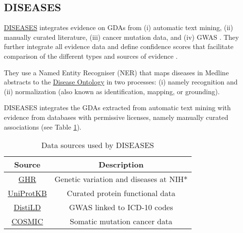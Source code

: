 \subsection{DISEASES}
\label{subsec:DISEASES}
\href{https://goo.gl/KGQsd9}{DISEASES} integrates evidence on GDAs from (i) automatic text mining, (ii) manually curated literature, (iii) cancer mutation data, and (iv) GWAS \cite{DISEASES2015}. They further integrate all evidence data and define confidence scores that facilitate comparison of the different types and sources of evidence \cite{DISEASES2015}.

They use a Named Entity Recogniser (NER) that maps diseases in Medline abstracts to the \href{http://disease-ontology.org/}{Disease Ontology} \cite{schriml2012} in two processes: (i) namely recognition and (ii) normalization (also known as identification, mapping, or grounding).

DISEASES integrates the GDAs extracted from automatic text mining with evidence from databases with permissive licenses, namely manually curated associations (see Table \ref{tab:diseases_data}).
\begin{table}[H]
\centering
    \begin{tabular}{c|c}
         Source & Description  \\
         \hline
         \href{https://goo.gl/gnQSYt}{GHR} & Genetic variation and diseases at NIH*\\
         \href{https://goo.gl/d2PhpC}{UniProtKB} & Curated protein functional data \cite{uniprot2017} \\
         \href{https://goo.gl/hYjVeR}{DistiLD} & GWAS linked to ICD-10 codes \cite{palleja2011} \\
         \href{https://goo.gl/qcY8qo}{COSMIC} & Somatic mutation cancer data \cite{cosmic2017}
    \end{tabular}
    \caption{Data sources used by DISEASES \cite{DISEASES2015} \label{tab:diseases_data}}
\end{table}